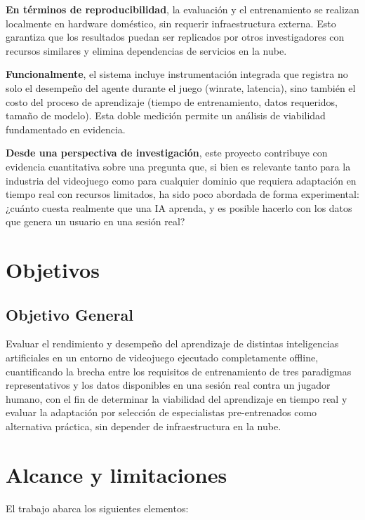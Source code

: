 \textbf{En términos de reproducibilidad}, la evaluación y el entrenamiento se realizan localmente en hardware doméstico, sin requerir infraestructura externa. Esto garantiza que los resultados puedan ser replicados por otros investigadores con recursos similares y elimina dependencias de servicios en la nube.

\textbf{Funcionalmente}, el sistema incluye instrumentación integrada que registra no solo el desempeño del agente durante el juego (winrate, latencia), sino también el costo del proceso de aprendizaje (tiempo de entrenamiento, datos requeridos, tamaño de modelo). Esta doble medición permite un análisis de viabilidad fundamentado en evidencia.

\textbf{Desde una perspectiva de investigación}, este proyecto contribuye con evidencia cuantitativa sobre una pregunta que, si bien es relevante tanto para la industria del videojuego como para cualquier dominio que requiera adaptación en tiempo real con recursos limitados, ha sido poco abordada de forma experimental: ¿cuánto cuesta realmente que una IA aprenda, y es posible hacerlo con los datos que genera un usuario en una sesión real?

\section{Objetivos}

\subsection{Objetivo General}

Evaluar el rendimiento y desempeño del aprendizaje de distintas inteligencias artificiales en un entorno de videojuego ejecutado completamente offline, cuantificando la brecha entre los requisitos de entrenamiento de tres paradigmas representativos y los datos disponibles en una sesión real contra un jugador humano, con el fin de determinar la viabilidad del aprendizaje en tiempo real y evaluar la adaptación por selección de especialistas pre-entrenados como alternativa práctica, sin depender de infraestructura en la nube.

\section{Alcance y limitaciones}

El trabajo abarca los siguientes elementos:

